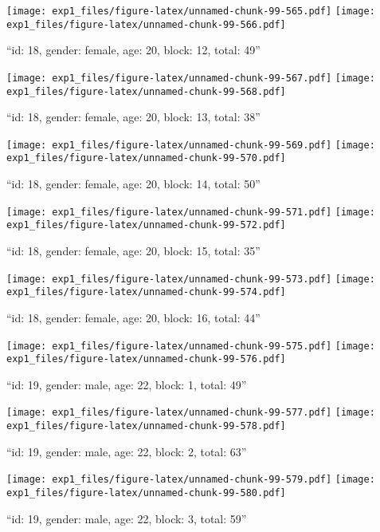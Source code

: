 \documentclass[,]{article}
\begin{document}
\texttt{[image: exp1\_files/figure-latex/unnamed-chunk-99-565.pdf]}
\texttt{[image: exp1\_files/figure-latex/unnamed-chunk-99-566.pdf]}

\newpage
[1] 

``id: 18, gender: female, age: 20, block: 12, total: 49''

\texttt{[image: exp1\_files/figure-latex/unnamed-chunk-99-567.pdf]}
\texttt{[image: exp1\_files/figure-latex/unnamed-chunk-99-568.pdf]}

\newpage
[1] 

``id: 18, gender: female, age: 20, block: 13, total: 38''

\texttt{[image: exp1\_files/figure-latex/unnamed-chunk-99-569.pdf]}
\texttt{[image: exp1\_files/figure-latex/unnamed-chunk-99-570.pdf]}

\newpage
[1] 

``id: 18, gender: female, age: 20, block: 14, total: 50''

\texttt{[image: exp1\_files/figure-latex/unnamed-chunk-99-571.pdf]}
\texttt{[image: exp1\_files/figure-latex/unnamed-chunk-99-572.pdf]}

\newpage
[1] 

``id: 18, gender: female, age: 20, block: 15, total: 35''

\texttt{[image: exp1\_files/figure-latex/unnamed-chunk-99-573.pdf]}
\texttt{[image: exp1\_files/figure-latex/unnamed-chunk-99-574.pdf]}

\newpage
[1] 

``id: 18, gender: female, age: 20, block: 16, total: 44''

\texttt{[image: exp1\_files/figure-latex/unnamed-chunk-99-575.pdf]}
\texttt{[image: exp1\_files/figure-latex/unnamed-chunk-99-576.pdf]}

\newpage
[1] 

``id: 19, gender: male, age: 22, block: 1, total: 49''

\texttt{[image: exp1\_files/figure-latex/unnamed-chunk-99-577.pdf]}
\texttt{[image: exp1\_files/figure-latex/unnamed-chunk-99-578.pdf]}

\newpage
[1] 

``id: 19, gender: male, age: 22, block: 2, total: 63''

\texttt{[image: exp1\_files/figure-latex/unnamed-chunk-99-579.pdf]}
\texttt{[image: exp1\_files/figure-latex/unnamed-chunk-99-580.pdf]}

\newpage
[1] 

``id: 19, gender: male, age: 22, block: 3, total: 59''
\end{document}
